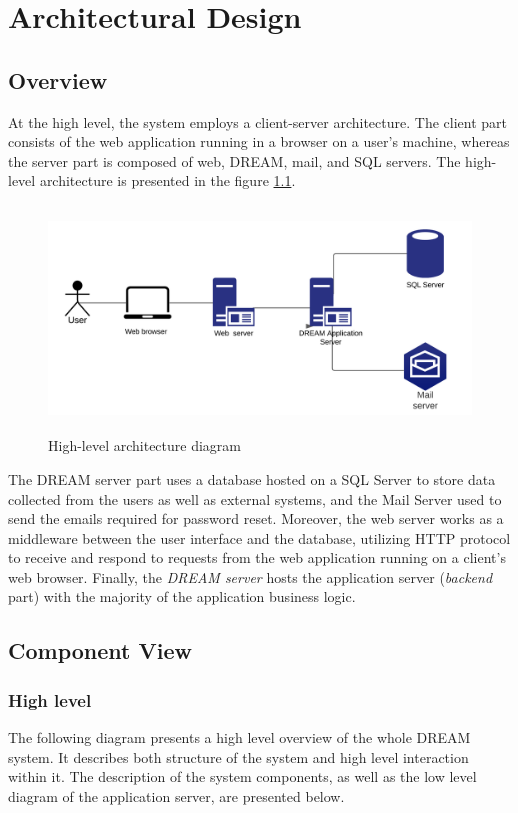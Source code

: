 \chapter{Architectural Design} \label{ch:architectural_design}


\section{Overview}
 At the high level, the system employs a client-server architecture. The client part consists of the web application running in a browser on a user's machine, whereas the server part is composed of web, DREAM, mail, and SQL servers. The high-level architecture is presented in the figure \ref{fig:high-level-architecture}.

\begin{figure}[H]
    \centering
    \includegraphics[width=12cm, height=6cm]
    {figures/Overview.png}
    \caption{High-level architecture diagram}
    \label{fig:high-level-architecture}
\end{figure}

The DREAM server part uses a database hosted on a SQL Server to store data collected from the users as well as external systems, and the Mail Server used to send the emails required for password reset. Moreover, the web server works as a middleware between the user interface and the database, utilizing HTTP protocol to receive and respond to requests from the web application running on a client's web browser. Finally, the \textit{DREAM server} hosts the application server (\textit{backend} part) with the majority of the application business logic. 

\section{Component View} \label{sec:component-view}

\subsection{High level}
The following diagram presents a high level overview of the whole DREAM system. It describes both structure of the system and high level interaction within it. The description of the system components, as well as the low level diagram of the application server, are presented below.


